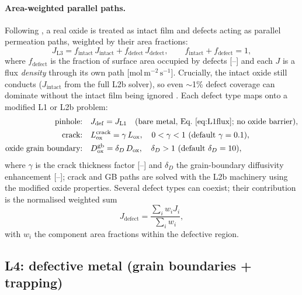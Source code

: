 \documentclass[11pt,a4paper]{article}
\newcommand{\Dox}{D_{\mathrm{ox}}}
\newcommand{\Lox}{L_{\mathrm{ox}}}
\begin{document}
\paragraph{Area-weighted parallel paths.} Following
\citet{strehlow1974}, a real oxide is treated as intact film and defects
acting as parallel permeation paths, weighted by their area fractions:
\begin{equation}
  J_{\mathrm{L3}} = f_{\mathrm{intact}}\, J_{\mathrm{intact}}
                  + f_{\mathrm{defect}}\, J_{\mathrm{defect}},
  \qquad f_{\mathrm{intact}} + f_{\mathrm{defect}} = 1,
  \label{eq:L3parallel}
\end{equation}
where $f_{\mathrm{defect}}$ is the fraction of surface area occupied by
defects [--] and each $J$ is a flux \emph{density} through its own path
[$\mathrm{mol\,m^{-2}\,s^{-1}}$]. Crucially, the intact oxide still conducts
($J_{\mathrm{intact}}$ from the full L2b solver), so even $\sim$1\% defect
coverage can dominate without the intact film being ignored
\citep{zarchy1979}. Each defect type maps onto a modified L1 or L2b problem:
\begin{align}
  \text{pinhole:}&\quad J_{\mathrm{def}} = J_{\mathrm{L1}}
    \quad\text{(bare metal, Eq.~\eqref{eq:L1flux}; no oxide barrier)},
    \nonumber\\
  \text{crack:}&\quad \Lox^{\mathrm{crack}} = \gamma\,\Lox,
    \quad 0<\gamma<1 \text{ (default } \gamma=0.1\text{)},
    \label{eq:crack}\\
  \text{oxide grain boundary:}&\quad \Dox^{\mathrm{gb}} = \delta_D\,\Dox,
    \quad \delta_D>1 \text{ (default } \delta_D=10\text{)},
    \label{eq:gbdefect}
\end{align}
where $\gamma$ is the crack thickness factor [--] and $\delta_D$ the
grain-boundary diffusivity enhancement [--]; crack and GB paths are solved
with the L2b machinery using the modified oxide properties. Several defect
types can coexist; their contribution is the normalised weighted sum
\begin{equation}
  J_{\mathrm{defect}} = \frac{\sum_i w_i J_i}{\sum_i w_i},
  \label{eq:mixed}
\end{equation}
with $w_i$ the component area fractions within the defective region.

\subsection{L4: defective metal (grain boundaries + trapping)}
\end{document}
